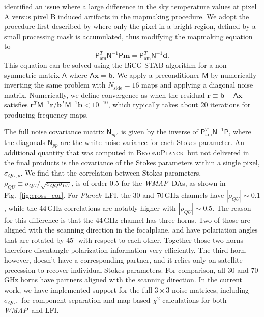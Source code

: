 \documentclass[twocolumn]{../../common/aa}
\def\WMAP{\emph{WMAP}}
\def\Planck{\emph{Planck}}
\newcommand{\bp}{\textsc{BeyondPlanck}}
\begin{document}
\citet{jarosik2010} identified an issue where a large difference in the sky temperature values at pixel A versus pixel B induced artifacts in the mapmaking procedure. We adopt the procedure first described by \citet{hinshaw2003a} where only the pixel in a bright region, defined by a small processing mask \citep{bennett2012} is accumulated, thus modifying the mapmaking equation to
\begin{equation}
	\mathsf P^T_\mathrm{am}\mathsf N^{-1}\mathsf P\boldsymbol m
	=\mathsf P^T_\mathrm{am}\mathsf N^{-1}\boldsymbol d.
	\label{eq:bicg_stab}
\end{equation}
This equation can be solved using the BiCG-STAB algorithm for a non-symmetric matrix $\mathsf A$ where $\mathsf A\boldsymbol x=\boldsymbol b$. We apply a preconditioner $\mathsf M$ by numerically inverting the same problem with $N_\mathrm{side}=16$ maps and applying a diagonal noise matrix. Numerically, we define convergence as when the residual $\boldsymbol r\equiv\boldsymbol b-\mathsf A\boldsymbol x$ satisfies $\boldsymbol r^T\mathsf M^{-1}\boldsymbol r/\boldsymbol b^T\mathsf M^{-1}\boldsymbol b<10^{-10}$, which typically takes about 20 iterations for producing frequency maps.

The full noise covariance matrix $\mathsf N_{pp'}$ is given by the inverse of $\mathsf P^T_\mathrm{am}\mathsf N^{-1}\mathsf P$, where the diagonals $\mathsf N_{pp}$ are the white noise variance for each Stokes parameter. An additional quantity that was computed in \bp\ but not delivered in the final products is the covariance of the Stokes parameters within a single pixel, $\sigma_{QU,p}$. We find that the correlation between Stokes parameters, $\rho_{QU}\equiv\sigma_{QU}/\sqrt{\sigma_{QQ}\sigma_{UU}}$, is of order 0.5 for the \WMAP\ DAs, as shown in Fig.~\ref{fig:cross_cor}. For \Planck\ LFI, the 30 and 70\,GHz channels have $|\rho_{QU}|\sim0.1$, while the 44\,GHz correlations are notably higher with $|\rho_{QU}|\sim0.5$. The reason for this difference is that the 44\,GHz channel has three horns. Two of those are aligned with the scanning direction in the focalplane, and have polariation angles that are rotated by $45^{\circ}$ with respect to each other. Together those two horns therefore disentangle polarization information very efficiently. The third horn, however, doesn't have a corresponding partner, and it relies only on satellite precession to recover individual Stokes parameters. For comparison, all 30 and 70\,GHz horns have partners aligned with the scanning direction. In the current work, we have implemented support for the full $3\times 3$ noise matrices, including $\sigma_{QU},$ for component separation and map-based $\chi^2$ calculations for both \WMAP\ and LFI.
\end{document}
